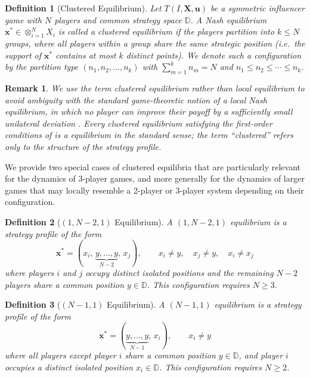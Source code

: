 \documentclass{article}
\newtheorem{definition}{Definition}
\newtheorem{remark}{Remark}
\begin{document}
                    \begin{definition}[Clustered Equilibrium]\label{def:SI_clustered_equilibria}
                        Let $T(I, \mathbf{X}, \mathbf{u})$ be a symmetric influencer game with $N$ players and common strategy space $\mathbb{D}$. A Nash equilibrium $\mathbf{x}^* \in \otimes_{i=1}^N X_i$ is called a clustered equilibrium if the players partition into $k \leq N$ groups, where all players within a group share the same strategic position (i.e.\ the support of $\mathbf{x}^*$ contains at most $k$ distinct points). We denote such a configuration by the partition type $(n_1, n_2, \ldots, n_k)$ with $\sum_{m=1}^k n_m = N$ and $n_1 \leq n_2 \leq \cdots \leq n_k$.
                    \end{definition}
                    \begin{remark}
                        We use the term clustered equilibrium rather than local equilibrium to avoid ambiguity with the standard game-theoretic notion of a local Nash equilibrium, in which no player can improve their payoff by a sufficiently small unilateral deviation \cite{osborne1994course}. Every clustered equilibrium satisfying the first-order conditions of  is a  equilibrium in the standard sense; the term ``clustered'' refers only to the structure of the strategy profile.
                    \end{remark}
                We provide two special cases of clustered equilibria that are particularly relevant for the dynamics of 3-player games, and more generally for the dynamics of larger games that may locally resemble a 2-player or 3-player system depending on their configuration. 
                \begin{definition}[$(1, N-2, 1)$ Equilibrium]\label{def:SI_1N21_equilibrium}
                    A $(1, N-2, 1)$ equilibrium is a strategy profile of the form
                    \begin{equation}
                        \mathbf{x}^* = (x_i,\, \underbrace{y, \ldots, y}_{N-2},\, x_j), \qquad x_i \neq y,\quad x_j \neq y,\quad x_i \neq x_j
                    \end{equation}
                    where players $i$ and $j$ occupy distinct isolated positions and the remaining $N-2$ players share a common position $y \in \mathbb{D}$. This configuration requires $N \geq 3$.
                \end{definition}

                \begin{definition}[$(N-1, 1)$ Equilibrium]\label{def:SI_N11_equilibrium}
                    A $(N-1, 1)$ equilibrium is a strategy profile of the form
                    \begin{equation}
                        \mathbf{x}^* = (\underbrace{y, \ldots, y}_{N-1},\, x_i), 
                        \qquad x_i \neq y
                    \end{equation}
                    where all players except player $i$ share a common position $y\in \mathbb{D}$, and player $i$ occupies a distinct isolated position $x_i \in \mathbb{D}$. This configuration requires $N \geq 2$.
                \end{definition}
\end{document}
